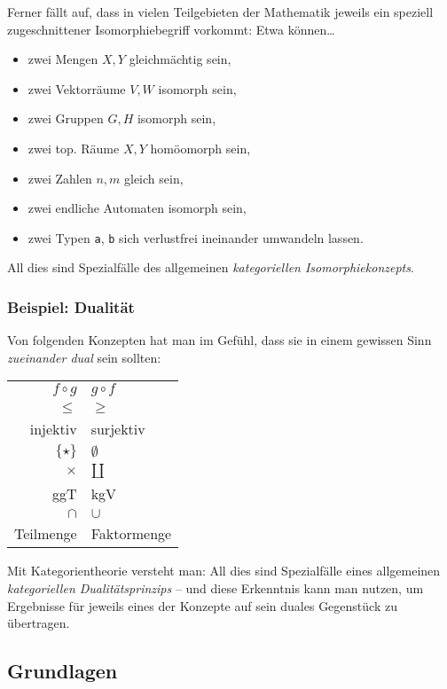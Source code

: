 \documentclass[a4paper,ngerman]{scrartcl}
\theoremstyle{definition}
\theoremstyle{plain}
\theoremstyle{remark}
\begin{document}
Ferner fällt auf, dass in vielen Teilgebieten der Mathematik jeweils ein
speziell zugeschnittener Isomorphiebegriff vorkommt: Etwa können\ldots
\begin{itemize}
  \item zwei Mengen $X,Y$ \tabto{4.63cm} gleichmächtig sein,
  \item zwei Vektorräume $V,W$ \tabto{4.63cm} isomorph sein,
  \item zwei Gruppen $G,H$ \tabto{4.63cm} isomorph sein,
  \item zwei top. Räume $X,Y$ \tabto{4.63cm} homöomorph sein,
  \item zwei Zahlen $n,m$ \tabto{4.63cm} gleich sein,
  \item zwei endliche Automaten isomorph sein,
  \item zwei Typen \texttt{a}, \texttt{b} \tabto{4.63cm} sich verlustfrei ineinander umwandeln lassen.
\end{itemize}
All dies sind Spezialfälle des allgemeinen \emph{kategoriellen
Isomorphiekonzepts}.

\subsubsection*{Beispiel: Dualität}

Von folgenden Konzepten hat man im Gefühl, dass sie in einem gewissen Sinn
\emph{zueinander dual} sein sollten:
\begin{center}
  \setlength{\extrarowheight}{0.3em}
  \begin{tabular}{r|l}
    $f \circ g$ & $g \circ f$ \\
    $\leq$ & $\geq$ \\
    injektiv & surjektiv \\
    $\{\star\}$ & $\emptyset$ \\
    $\times$ & $\amalg$ \\
    ggT & kgV \\
    $\cap$ & $\cup$ \\
    Teilmenge & Faktormenge
  \end{tabular}
\end{center}
Mit Kategorientheorie versteht man: All dies sind Spezialfälle eines allgemeinen
\emph{kategoriellen Dualitätsprinzips} -- und diese Erkenntnis kann man nutzen,
um Ergebnisse für jeweils eines der Konzepte auf sein duales Gegenstück zu
übertragen.

\subsection{Grundlagen}
\end{document}
